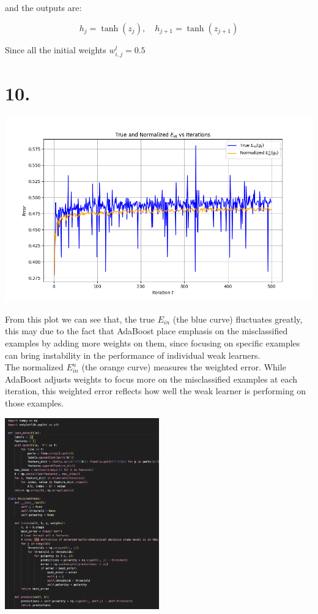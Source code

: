 \documentclass{article}
\begin{document}
and the outputs are:

\begin{equation*}
h_j = \tanh(z_j), \quad h_{j+1} = \tanh(z_{j+1})
\end{equation*}

Since all the initial weights $w_{i,j}^{l} = 0.5$

\newpage

\section*{10.}

\includegraphics[width = \textwidth, height = \textheight, keepaspectratio]{10_v6_result.png}

From this plot we can see that, the true $E_{in}$ (the blue curve) fluctuates greatly, 
this may due to the fact that AdaBoost place emphasis on the misclassified examples by adding more weights on them,
since focusing on specific examples can bring instability in the performance of individual weak learners. \\

The normalized $E_{in}^u$ (the orange curve) measures the weighted error.
While AdaBoost adjusts weights to focus more on the misclassified examples at each iteration,
this weighted error reflects how well the weak learner is performing on those examples.\\

\newpage

\includegraphics[width = 0.5\textwidth, keepaspectratio]{10_v6_snapshot_1.png}
\end{document}
